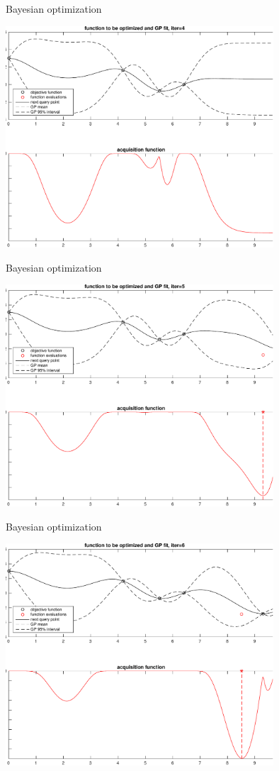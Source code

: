 \documentclass[t]{beamer}
\begin{document}
\begin{frame}
  
  {\Large\color{navyblue} Bayesian optimization}

    \includegraphics[width=10cm]{bayesopt_1d_regular_iter4-crop.pdf}

\end{frame}
\begin{frame}
  
  {\Large\color{navyblue} Bayesian optimization}

    \includegraphics[width=10cm]{bayesopt_1d_regular_iter5-crop.pdf}

\end{frame}
\begin{frame}
  
  {\Large\color{navyblue} Bayesian optimization}

    \includegraphics[width=10cm]{bayesopt_1d_regular_iter6-crop.pdf}

\end{frame}
\end{document}
